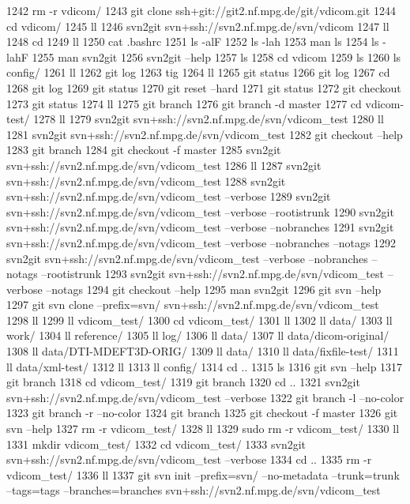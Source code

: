  1242  rm -r vdicom/
 1243  git clone ssh+git://git2.nf.mpg.de/git/vdicom.git
 1244  cd vdicom/
 1245  ll
 1246  svn2git svn+ssh://svn2.nf.mpg.de/svn/vdicom
 1247  ll
 1248  cd
 1249  ll
 1250  cat .bashrc
 1251  ls -alF
 1252  ls -lah
 1253  man ls
 1254  ls -lahF
 1255  man svn2git
 1256  svn2git --help
 1257  ls
 1258  cd vdicom
 1259  ls
 1260  ls config/
 1261  ll
 1262  git log
 1263  tig
 1264  ll
 1265  git status
 1266  git log
 1267  cd
 1268  git log
 1269  git status
 1270  git reset --hard
 1271  git status
 1272  git checkout
 1273  git status
 1274  ll
 1275  git branch
 1276  git branch -d master
 1277  cd vdicom-test/
 1278  ll
 1279  svn2git svn+ssh://svn2.nf.mpg.de/svn/vdicom_test
 1280  ll
 1281  svn2git svn+ssh://svn2.nf.mpg.de/svn/vdicom_test
 1282  git checkout --help
 1283  git branch
 1284  git checkout -f master
 1285  svn2git svn+ssh://svn2.nf.mpg.de/svn/vdicom_test
 1286  ll
 1287  svn2git svn+ssh://svn2.nf.mpg.de/svn/vdicom_test
 1288  svn2git svn+ssh://svn2.nf.mpg.de/svn/vdicom_test --verbose
 1289  svn2git svn+ssh://svn2.nf.mpg.de/svn/vdicom_test --verbose --rootistrunk
 1290  svn2git svn+ssh://svn2.nf.mpg.de/svn/vdicom_test --verbose --nobranches
 1291  svn2git svn+ssh://svn2.nf.mpg.de/svn/vdicom_test --verbose --nobranches --notags
 1292  svn2git svn+ssh://svn2.nf.mpg.de/svn/vdicom_test --verbose --nobranches --notags --rootistrunk
 1293  svn2git svn+ssh://svn2.nf.mpg.de/svn/vdicom_test --verbose --notags
 1294  git checkout --help
 1295  man svn2git
 1296  git svn --help
 1297  git svn clone --prefix=svn/ svn+ssh://svn2.nf.mpg.de/svn/vdicom_test
 1298  ll
 1299  ll vdicom_test/
 1300  cd vdicom_test/
 1301  ll
 1302  ll data/
 1303  ll work/
 1304  ll reference/
 1305  ll log/
 1306  ll data/
 1307  ll data/dicom-original/
 1308  ll data/DTI-MDEFT3D-ORIG/
 1309  ll data/
 1310  ll data/fixfile-test/
 1311  ll data/xml-test/
 1312  ll
 1313  ll config/
 1314  cd ..
 1315  ls
 1316  git svn --help
 1317  git branch
 1318  cd vdicom_test/
 1319  git branch
 1320  cd ..
 1321  svn2git svn+ssh://svn2.nf.mpg.de/svn/vdicom_test --verbose
 1322  git branch -l --no-color
 1323  git branch -r --no-color
 1324  git branch
 1325  git checkout -f master
 1326  git svn --help
 1327  rm -r vdicom_test/
 1328  ll
 1329  sudo rm -r vdicom_test/
 1330  ll
 1331  mkdir vdicom_test/
 1332  cd vdicom_test/
 1333  svn2git svn+ssh://svn2.nf.mpg.de/svn/vdicom_test --verbose
 1334  cd ..
 1335  rm -r vdicom_test/
 1336  ll
 1337  git svn init --prefix=svn/ --no-metadata --trunk=trunk --tags=tags --branches=branches svn+ssh://svn2.nf.mpg.de/svn/vdicom_test
